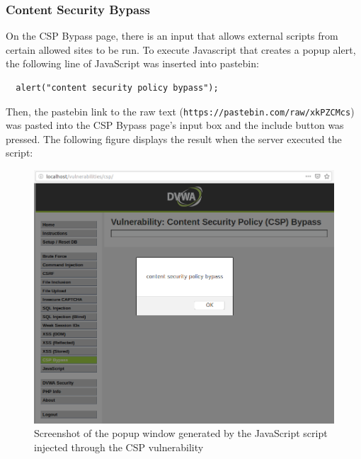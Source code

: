 \documentclass[11pt]{article}
\begin{document}
\subsubsection*{Content Security Bypass}
On the CSP Bypass page, there is an input that allows external scripts from certain allowed sites
to be run. To execute Javascript that creates a popup alert, the following line of JavaScript was inserted into pastebin:
\begin{verbatim}
  alert("content security policy bypass");
\end{verbatim}
Then, the pastebin link to the raw text (\verb|https://pastebin.com/raw/xkPZCMcs|) was pasted into the CSP Bypass page's input box and the include button was pressed.
The following figure displays the result when the server executed the script:
\begin{figure}[htbp]
  \centering
  \includegraphics[width=.9\linewidth]{./csp.png}
  \caption{\label{fig:csp}
  Screenshot of the popup window generated by the JavaScript script injected through the CSP vulnerability}
\end{figure}
\end{document}

